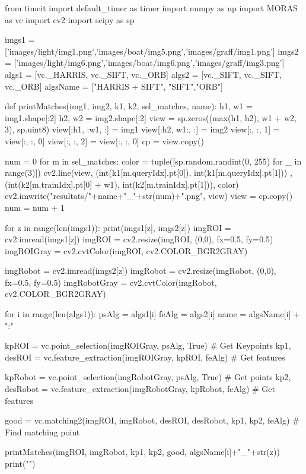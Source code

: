 \begin{python}
from timeit import default_timer as timer
import numpy as np
import MORAS as vc
import cv2
import scipy as sp

imgs1 = ['images/light/img1.png','images/boat/img5.png','images/graff/img1.png']
imgs2 = ['images/light/img6.png','images/boat/img6.png','images/graff/img3.png']
algs1 = [vc._HARRIS, vc._SIFT, vc._ORB]
algs2 = [vc._SIFT, vc._SIFT, vc._ORB]
algsName = ["HARRIS + SIFT", "SIFT","ORB"]

def printMatches(img1, img2, k1, k2, sel_matches, name):
	h1, w1 = img1.shape[:2]
	h2, w2 = img2.shape[:2]
	view = sp.zeros((max(h1, h2), w1 + w2, 3), sp.uint8)
	view[:h1, :w1, :] = img1  
	view[:h2, w1:, :] = img2
	view[:, :, 1] = view[:, :, 0]  
	view[:, :, 2] = view[:, :, 0]
	cp = view.copy()

	num = 0
	for m in sel_matches:
		color = tuple([sp.random.randint(0, 255) for _ in range(3)])
		cv2.line(view, (int(k1[m.queryIdx].pt[0]), int(k1[m.queryIdx].pt[1])) , (int(k2[m.trainIdx].pt[0] + w1), int(k2[m.trainIdx].pt[1])), color)
		cv2.imwrite("resultats/"+name+"_"+str(num)+".png", view)
		view = cp.copy()
		num = num + 1

for z in range(len(imgs1)):
	print(imgs1[z], imgs2[z])
	imgROI = cv2.imread(imgs1[z])
	imgROI = cv2.resize(imgROI, (0,0), fx=0.5, fy=0.5)
	imgROIGray = cv2.cvtColor(imgROI, cv2.COLOR_BGR2GRAY)

	imgRobot = cv2.imread(imgs2[z])
	imgRobot = cv2.resize(imgRobot, (0,0), fx=0.5, fy=0.5)
	imgRobotGray = cv2.cvtColor(imgRobot, cv2.COLOR_BGR2GRAY)

	for i in range(len(algs1)):
		psAlg = algs1[i]
		feAlg = algs2[i]
		name = algsName[i] + ":"

		kpROI = vc.point_selection(imgROIGray, psAlg, True)				# Get Keypoints
		kp1, desROI = vc.feature_extraction(imgROIGray, kpROI, feAlg)	# Get features

		kpRobot = vc.point_selection(imgRobotGray, psAlg, True)					# Get points
		kp2, desRobot = vc.feature_extraction(imgRobotGray, kpRobot, feAlg)	# Get features

		good = vc.matching2(imgROI, imgRobot, desROI, desRobot, kp1, kp2, feAlg)	# Find matching point

		printMatches(imgROI, imgRobot, kp1, kp2, good, algsName[i]+"_"+str(z))
	print("\n")
\end{python}
